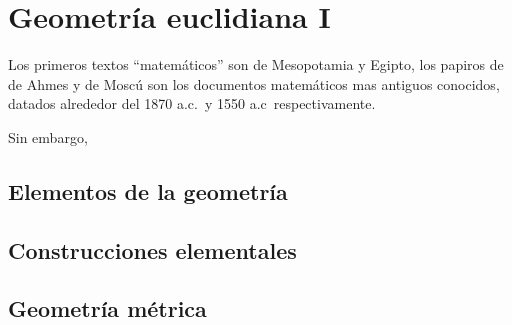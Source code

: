 \chapter{Geometría euclidiana I} %
\label{cha:geometria_euclidiana_i}

 Los primeros
textos ``matemáticos'' son de Mesopotamia y Egipto, los papiros de de Ahmes y de
Moscú son los documentos matemáticos mas antiguos conocidos, datados alrededor
del 1870 a.c.\ y 1550 a.c\ respectivamente. 

Sin embargo, 

\section{Elementos de la geometría} %
\label{sec:elementos_de_la_geometria}

\section{Construcciones elementales} %
\label{sec:construcciones_elementales}

\section{Geometría métrica} %
\label{sec:geometria_metrica}

